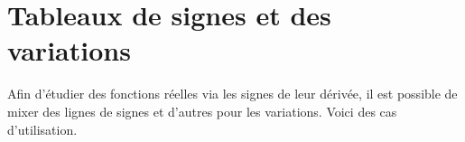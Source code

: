 \documentclass{tutodoc}
\begin{document}
\section{Tableaux de signes et des variations}

Afin d'étudier des fonctions réelles via les signes de leur dérivée, il est possible de mixer des lignes de signes et d'autres pour les variations. Voici des cas d'utilisation.
 
\end{document}
